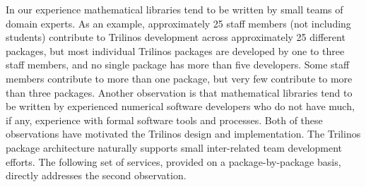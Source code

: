 \documentclass[acmtoms,acmnow]{acmtrans2m}
\begin{document}
In our experience mathematical libraries tend to be written by small
teams of domain experts.  As an example, approximately 25 staff
members (not including students) contribute to Trilinos development 
across approximately 25
different packages, but most individual Trilinos packages
are developed by one to three staff members, and no single package 
has more than five
developers.   Some staff members contribute to more than one package,
but very few contribute to more than three packages.  Another
observation is that mathematical libraries tend to be written
by experienced numerical software
developers who do not have much, if any, experience with formal
software tools and processes.  Both of these observations have
motivated the Trilinos design and implementation.  The Trilinos
package architecture naturally supports small inter-related team
development efforts.  The following set of services, provided on a
package-by-package basis, directly addresses the second observation.
\end{document}

